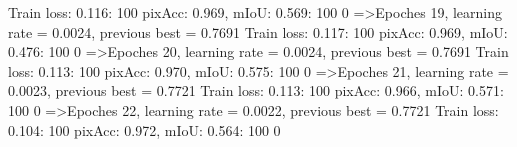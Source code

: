 Train loss: 0.116: 100%
pixAcc: 0.969, mIoU: 0.569: 100%
  0%
=>Epoches 19, learning rate = 0.0024,                 previous best = 0.7691
Train loss: 0.117: 100%
pixAcc: 0.969, mIoU: 0.476: 100%
  0%
=>Epoches 20, learning rate = 0.0024,                 previous best = 0.7691
Train loss: 0.113: 100%
pixAcc: 0.970, mIoU: 0.575: 100%
  0%
=>Epoches 21, learning rate = 0.0023,                 previous best = 0.7721
Train loss: 0.113: 100%
pixAcc: 0.966, mIoU: 0.571: 100%
  0%
=>Epoches 22, learning rate = 0.0022,                 previous best = 0.7721
Train loss: 0.104: 100%
pixAcc: 0.972, mIoU: 0.564: 100%
  0%
